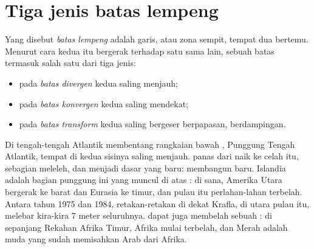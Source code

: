 \section{Tiga jenis batas lempeng}

\begin{definition}\label{def:g7:plate-tectonics:plate-boundary}
Yang disebut \emph{batas lempeng} adalah garis, atau
zona sempit, tempat dua  bertemu. Menurut cara kedua  itu
bergerak terhadap satu sama lain, sebuah batas termasuk salah satu dari
tiga jenis:
\begin{itemize}
  \item pada \emph{batas divergen} kedua 
        saling menjauh;
  \item pada \emph{batas konvergen} kedua 
        saling mendekat;
  \item pada \emph{batas transform} kedua 
        saling bergeser berpapasan, berdampingan.
\end{itemize}
\end{definition}

\begin{example}\label{ex:g7:plate-tectonics:divergent}
Di tengah-tengah  Atlantik membentang rangkaian  bawah
, Punggung Tengah Atlantik, tempat  di kedua sisinya
saling menjauh.  panas dari  naik ke celah itu, sebagian
meleleh, dan menjadi dasar  yang baru:  membangun 
baru. Islandia adalah bagian punggung ini yang muncul di atas : di
sana, Amerika Utara bergerak ke barat dan Eurasia ke timur, dan pulau itu
perlahan-lahan terbelah. Antara tahun 1975 dan 1984, retakan-retakan di
dekat  Krafla, di utara pulau itu, melebar kira-kira 7 meter
seluruhnya.  dapat juga membelah sebuah : di sepanjang
Rekahan Afrika Timur, Afrika mulai terbelah, dan  Merah adalah 
muda yang sudah memisahkan Arab dari Afrika.
\end{example}

